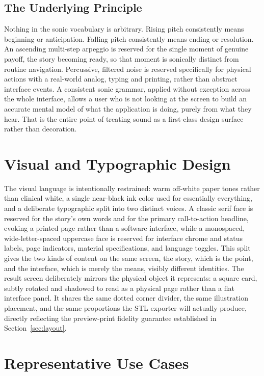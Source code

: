 \documentclass[conference]{IEEEtran}
\begin{document}
\subsection{The Underlying Principle}

Nothing in the sonic vocabulary is arbitrary. Rising pitch consistently means beginning or anticipation. Falling pitch consistently means ending or resolution. An ascending multi-step arpeggio is reserved for the single moment of genuine payoff, the story becoming ready, so that moment is sonically distinct from routine navigation. Percussive, filtered noise is reserved specifically for physical actions with a real-world analog, typing and printing, rather than abstract interface events. A consistent sonic grammar, applied without exception across the whole interface, allows a user who is not looking at the screen to build an accurate mental model of what the application is doing, purely from what they hear. That is the entire point of treating sound as a first-class design surface rather than decoration.

\section{Visual and Typographic Design}\label{sec:visual}

The visual language is intentionally restrained: warm off-white paper tones rather than clinical white, a single near-black ink color used for essentially everything, and a deliberate typographic split into two distinct voices. A classic serif face is reserved for the story's own words and for the primary call-to-action headline, evoking a printed page rather than a software interface, while a monospaced, wide-letter-spaced uppercase face is reserved for interface chrome and status labels, page indicators, material specifications, and language toggles. This split gives the two kinds of content on the same screen, the story, which is the point, and the interface, which is merely the means, visibly different identities. The result screen deliberately mirrors the physical object it represents: a square card, subtly rotated and shadowed to read as a physical page rather than a flat interface panel. It shares the same dotted corner divider, the same illustration placement, and the same proportions the STL exporter will actually produce, directly reflecting the preview-print fidelity guarantee established in Section~\ref{sec:layout}.

\section{Representative Use Cases}\label{sec:usecases}
\end{document}
